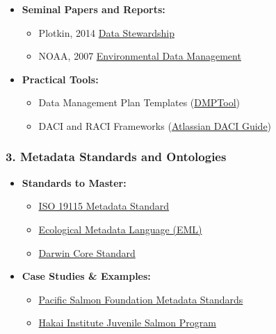 \documentclass[
  letterpaper,
  DIV=11,
  numbers=noendperiod]{scrartcl}
\providecommand{\tightlist}{%
  \setlength{\itemsep}{0pt}\setlength{\parskip}{0pt}}\usepackage{longtable,booktabs,array}
\begin{document}
\begin{itemize}
\tightlist
\item
  \textbf{Seminal Papers and Reports:}

  \begin{itemize}
  \tightlist
  \item
    Plotkin, 2014 \href{https://doi.org/10.1016/c2012-0-07057-3}{Data
    Stewardship}
  \item
    NOAA, 2007 \href{https://doi.org/10.17226/12017}{Environmental Data
    Management}
  \end{itemize}
\item
  \textbf{Practical Tools:}

  \begin{itemize}
  \tightlist
  \item
    Data Management Plan Templates (\href{https://dmptool.org}{DMPTool})
  \item
    DACI and RACI Frameworks
    (\href{https://www.atlassian.com/team-playbook/plays/daci}{Atlassian
    DACI Guide})
  \end{itemize}
\end{itemize}

\subsubsection{3. Metadata Standards and
Ontologies}\label{metadata-standards-and-ontologies}

\begin{itemize}
\tightlist
\item
  \textbf{Standards to Master:}

  \begin{itemize}
  \tightlist
  \item
    \href{https://www.iso.org/standard/53798.html}{ISO 19115 Metadata
    Standard}
  \item
    \href{https://eml.ecoinformatics.org/}{Ecological Metadata Language
    (EML)}
  \item
    \href{https://dwc.tdwg.org/}{Darwin Core Standard}
  \end{itemize}
\item
  \textbf{Case Studies \& Examples:}

  \begin{itemize}
  \tightlist
  \item
    \href{https://marinedata.psf.ca}{Pacific Salmon Foundation Metadata
    Standards}
  \item
    \href{https://obis.org/dataset/81a9b931-8f47-49c4-94ff-0e46d7e9f1c9}{Hakai
    Institute Juvenile Salmon Program}
  \end{itemize}
\end{itemize}
\end{document}

